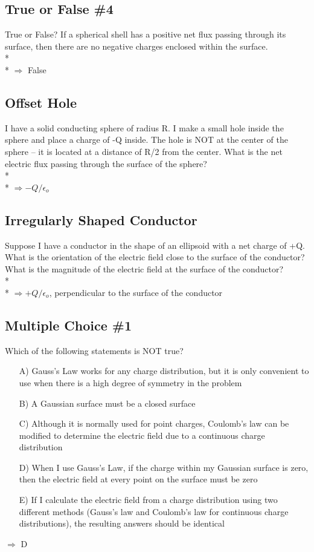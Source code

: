 \documentclass[11pt]{article}
\begin{document}
\subsection{True or False \#4}
True or False?  If a spherical shell has a positive net flux passing through its surface, then there are no negative charges enclosed within the surface.\\* \\*
$\Rightarrow$ False

\subsection{Offset Hole}
I have a solid conducting sphere of radius R.  I make a small hole inside the sphere and place a charge of -Q inside.  The hole is NOT at the center of the sphere – it is located at a distance of R/2 from the center.  What is the net electric flux passing through the surface of the sphere?\\* \\*
$\Rightarrow -Q/\epsilon_o$

\subsection{Irregularly Shaped Conductor}
Suppose I have a conductor in the shape of an ellipsoid with a net charge of +Q.  What is the orientation of the electric field close to the surface of the conductor?  What is the magnitude of the electric field at the surface of the conductor?\\* \\*
$\Rightarrow +Q/\epsilon_o$, perpendicular to the surface of the conductor

\pagebreak
\subsection{Multiple Choice \#1}
Which of the following statements is NOT true?

\begin{itemize}
 \item[A)] Gauss's Law works for any charge distribution, but it is only convenient to use when there is a high degree of symmetry in the problem
 \item[B)] A Gaussian surface must be a closed surface
 \item[C)] Although it is normally used for point charges, Coulomb's law can be modified to determine the electric field due to a continuous charge distribution
 \item[D)] When I use Gauss's Law, if the charge within my Gaussian surface is zero, then the electric field at every point on the surface must be zero
 \item[E)] If I calculate the electric field from a charge distribution using two different methods (Gauss's law and Coulomb's law for continuous charge distributions), the resulting answers should be identical
\end{itemize}
$\Rightarrow$ D
\end{document}

